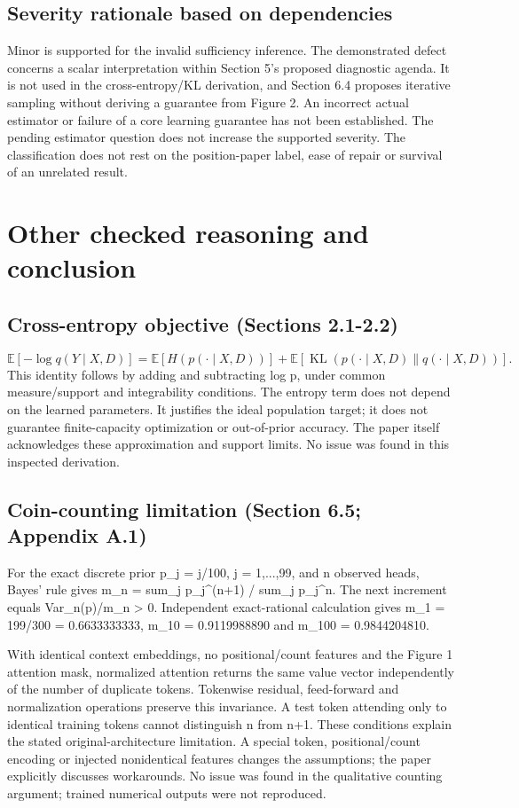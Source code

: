 \documentclass[10pt]{article}
\begin{document}
\subsection*{Severity rationale based on dependencies}
Minor is supported for the invalid sufficiency inference. The demonstrated defect concerns a scalar interpretation within Section 5’s proposed diagnostic agenda. It is not used in the cross-entropy/KL derivation, and Section 6.4 proposes iterative sampling without deriving a guarantee from Figure 2. An incorrect actual estimator or failure of a core learning guarantee has not been established. The pending estimator question does not increase the supported severity. The classification does not rest on the position-paper label, ease of repair or survival of an unrelated result.\par
\section*{Other checked reasoning and conclusion}
\subsection*{Cross-entropy objective (Sections 2.1-2.2)}
\[\mathbb E[-\log q(Y\mid X,D)]=\mathbb E[H(p(\cdot\mid X,D))]+\mathbb E[\operatorname{KL}(p(\cdot\mid X,D)\|q(\cdot\mid X,D))].\] This identity follows by adding and subtracting log p, under common measure/support and integrability conditions. The entropy term does not depend on the learned parameters. It justifies the ideal population target; it does not guarantee finite-capacity optimization or out-of-prior accuracy. The paper itself acknowledges these approximation and support limits. No issue was found in this inspected derivation.\par
\subsection*{Coin-counting limitation (Section 6.5; Appendix A.1)}
For the exact discrete prior p\_j = j/100, j = 1,...,99, and n observed heads, Bayes’ rule gives m\_n = sum\_j p\_j\textasciicircum{}(n+1) / sum\_j p\_j\textasciicircum{}n. The next increment equals Var\_n(p)/m\_n > 0. Independent exact-rational calculation gives m\_1 = 199/300 = 0.6633333333, m\_10 = 0.9119988890 and m\_100 = 0.9844204810.\par
With identical context embeddings, no positional/count features and the Figure 1 attention mask, normalized attention returns the same value vector independently of the number of duplicate tokens. Tokenwise residual, feed-forward and normalization operations preserve this invariance. A test token attending only to identical training tokens cannot distinguish n from n+1. These conditions explain the stated original-architecture limitation. A special token, positional/count encoding or injected nonidentical features changes the assumptions; the paper explicitly discusses workarounds. No issue was found in the qualitative counting argument; trained numerical outputs were not reproduced.\par
\end{document}
